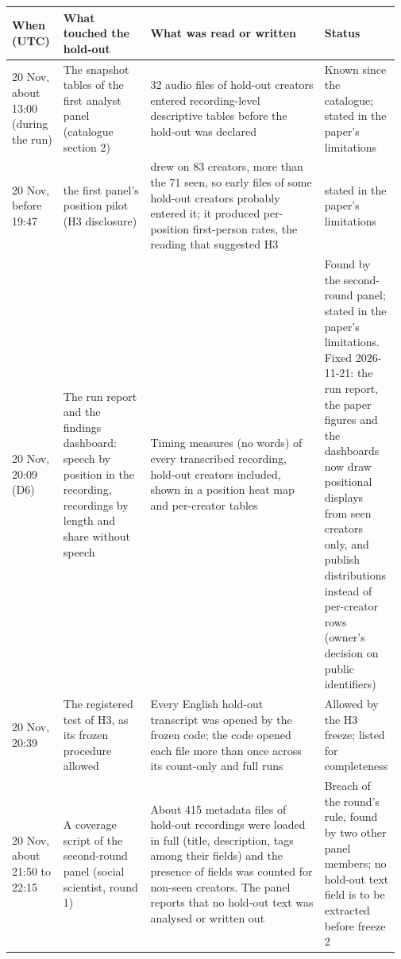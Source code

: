 {\scriptsize\setlength{\tabcolsep}{2pt}
\begin{tabular}{@{}p{0.13\linewidth}p{0.22\linewidth}p{0.44\linewidth}p{0.18\linewidth}@{}}
\toprule
When (UTC) & What touched the hold-out & What was read or written & Status \\
\midrule
20 Nov, about 13:00 (during the run) & The snapshot tables of the first analyst panel (catalogue section 2) & 32 audio files of hold-out creators entered recording-level descriptive tables before the hold-out was declared & Known since the catalogue; stated in the paper's limitations \\
20 Nov, before 19:47 & the first panel's position pilot (H3 disclosure) & drew on 83 creators, more than the 71 seen, so early files of some hold-out creators probably entered it; it produced per-position first-person rates, the reading that suggested H3 & stated in the paper's limitations \\
20 Nov, 20:09 (D6) & The run report and the findings dashboard: speech by position in the recording, recordings by length and share without speech & Timing measures (no words) of every transcribed recording, hold-out creators included, shown in a position heat map and per-creator tables & Found by the second-round panel; stated in the paper's limitations. Fixed 2026-11-21: the run report, the paper figures and the dashboards now draw positional displays from seen creators only, and publish distributions instead of per-creator rows (owner's decision on public identifiers) \\
20 Nov, 20:39 & The registered test of H3, as its frozen procedure allowed & Every English hold-out transcript was opened by the frozen code; the code opened each file more than once across its count-only and full runs & Allowed by the H3 freeze; listed for completeness \\
20 Nov, about 21:50 to 22:15 & A coverage script of the second-round panel (social scientist, round 1) & About 415 metadata files of hold-out recordings were loaded in full (title, description, tags among their fields) and the presence of fields was counted for non-seen creators. The panel reports that no hold-out text was analysed or written out & Breach of the round's rule, found by two other panel members; no hold-out text field is to be extracted before freeze 2 \\

\end{tabular}}

